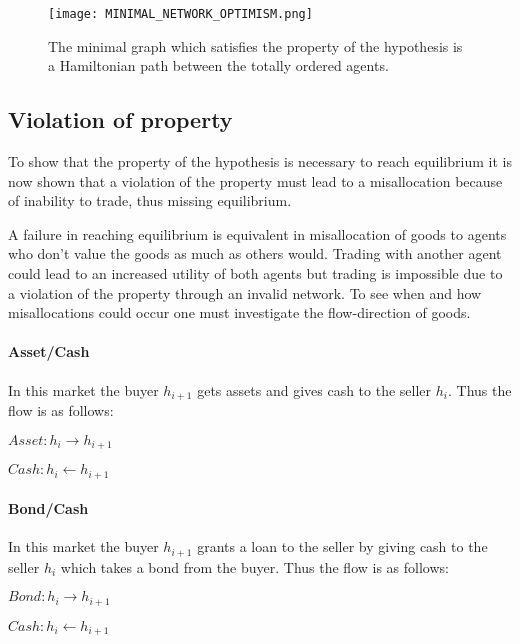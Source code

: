 \documentclass[Bachelorarbeit.tex]{subfiles}
\begin{document}
\begin{figure}[H]
	\centering
  \texttt{[image: MINIMAL\_NETWORK\_OPTIMISM.png]}
  	\caption{The minimal graph which satisfies the property of the hypothesis is a Hamiltonian path between the totally ordered agents.}
	\label{fig:MINIMAL_NETWORK_OPTIMISM}
\end{figure}

\subsection{Violation of property}
To show that the property of the hypothesis is necessary to reach equilibrium it is now shown that a violation of the property must lead to a misallocation because of inability to trade, thus missing equilibrium.

\medskip

A failure in reaching equilibrium is equivalent in misallocation of goods to agents who don't value the goods as much as others would. Trading with another agent could lead to an increased utility of both agents but trading is impossible due to a violation of the property through an invalid network. To see when and how misallocations could occur one must investigate the flow-direction of goods.

\paragraph{Asset/Cash} In this market the buyer $h_{i+1}$ gets assets and gives cash to the seller $h_i$. Thus the flow is as follows:
\begin{center}
$Asset: h_i \to h_{i+1}$
\end{center}
\begin{center}
$Cash: h_i \gets h_{i+1}$
\end{center}

\paragraph{Bond/Cash} In this market the buyer $h_{i+1}$ grants a loan to the seller by giving cash to the seller $h_i$ which takes a bond from the buyer. Thus the flow is as follows:
\begin{center}
$Bond: h_i \to h_{i+1}$
\end{center}
\begin{center}
$Cash: h_i \gets h_{i+1}$
\end{center}
\end{document}
